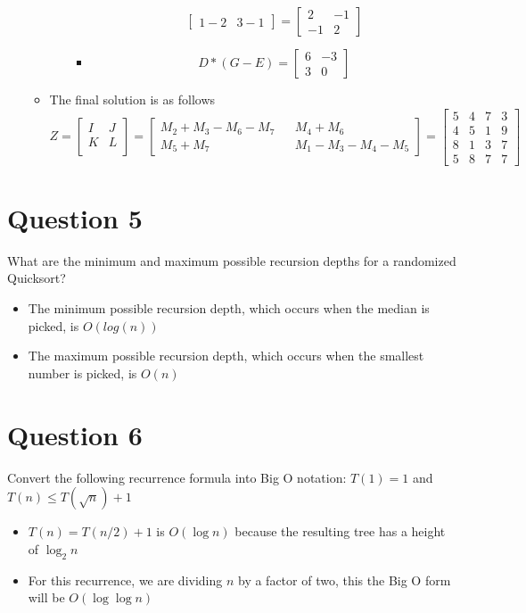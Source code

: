 \documentclass{article}
\begin{document}
\begin{itemize}
\begin{itemize}
\begin{itemize}
\begin{itemize}
\[\begin{bmatrix}
						1 - 2 & 3 - 1
						\end{bmatrix}
						= 
						\begin{bmatrix}
						2 & -1 \\
						-1 & 2
						\end{bmatrix}
						\]
						\item
						\[
						D * (G - E) = 
						\begin{bmatrix}
						6 & -3 \\
						3 & 0
						\end{bmatrix}
						\]
					\end{itemize}
			\end{itemize}
		\item The final solution is as follows
			\[
			Z = 
			\begin{bmatrix}
			I & J \\
			K & L \\
			\end{bmatrix}
			=
			\begin{bmatrix}
			M_2 + M_3 - M_6 - M_7 && M_4 + M_6 \\
			M_5 + M_7 && M_1 - M_3 - M_4 - M_5
			\end{bmatrix}
			=
			\begin{bmatrix}
			5 & 4 & 7 & 3 \\
			4 & 5 & 1 & 9 \\
			8 & 1 & 3 & 7 \\
			5 & 8 & 7 & 7
			\end{bmatrix}
			\]
 		\end{itemize}
	\end{itemize}

	\pagebreak
	\section{Question 5}
	What are the minimum and maximum possible recursion depths for a randomized Quicksort?
		\begin{itemize}
			\item The minimum possible recursion depth, which occurs when the median is picked, is $O(log(n))$
			\item The maximum possible recursion depth, which occurs when the smallest number is picked, is $O(n)$
		\end{itemize}
	\section{Question 6}
	Convert the following recurrence formula into Big O notation: 
	$T(1) = 1$ and $T(n) \le T(\sqrt n)+1$ 
		\begin{itemize}
			\item $T(n) = T(n/2) + 1$ is $O(\log n)$ because the resulting tree has a height of $\log_2 n$
			\item For this recurrence, we are dividing $n$ by a factor of two, this the Big O form will be $O(\log \log n)$
		\end{itemize}
\end{document}
